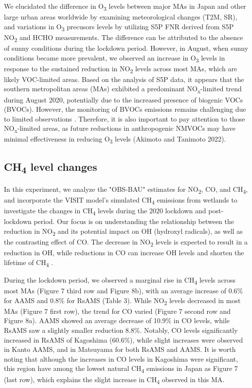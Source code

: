 We elucidated the difference in O\textsubscript{3} levels between major MAs in Japan and other large urban areas worldwide by examining meteorological changes (T2M, SR), and variations in O\textsubscript{3} precusors levels by utilizing S5P FNR derived from S5P NO\textsubscript{2} and HCHO measurements. The difference can be attributed to the absence of sunny conditions during the lockdown period. However, in August, when sunny conditions became more prevalent, we observed an increase in O\textsubscript{3} levels in response to the sustained reduction in NO\textsubscript{2} levels across most MAs, which are likely VOC-limited areas. Based on the analysis of S5P data, it appears that the southern metropolitan areas (MAs) exhibited a predominant NO\textsubscript{x}-limited trend during August 2020, potentially due to the increased presence of biogenic VOCs (BVOCs). However, the monitoring of BVOCs emissions remains challenging due to limited observations \citep{tani2021exchanges,ito2021terrestrial}. Therefore, it is also important to pay attention to those NO\textsubscript{x}-limited areas, as future reductions in anthropogenic NMVOCs may have minimal effectiveness in reducing O\textsubscript{3} levels (Akimoto and Tanimoto 2022). \par

\subsection{CH\textsubscript{4} level changes}
In this experiment, we analyze the "OBS-BAU" estimates for NO\textsubscript{2}, CO, and CH\textsubscript{4}, and incorporate the VISIT model's simulated CH\textsubscript{4} emissions from wetlands to investigate the changes in CH\textsubscript{4} levels during the 2020 lockdown and post-lockdown period. Our focus is on understanding the relationship between the reduction in NO\textsubscript{2} and its potential impact on OH (hydroxyl radicals), as well as the contrasting effect of CO. The decrease in NO\textsubscript{2} levels is expected to result in a reduction in OH, while reductions in CO can increase OH levels and shorten the lifetime of CH\textsubscript{4} \citep{akimoto2022rethinking}.\par
During the lockdown period, we observed a marginal rise in CH\textsubscript{4} levels across most MAs (Figure 7 third row and Figure 8b), with an average increase of 0.6\% for AAMS and 0.8\% for RsAMS (Table 3). While NO\textsubscript{2} levels decreased in most MAs (Figure 7 first row), the trend for CO varied (Figure 7 second row and Figure 8a). AAMS showed an average decrease of 10.9\% in CO levels, while RsAMS saw a slightly smaller reduction 8.8\%. Notably, CO levels significantly increased in RsAMS of Kagoshima (60.6\%), while slight increases were observed in Kanto AAMS, and in Matsuyama for both RsAMS and AAMS. It is worth noting that although the increases in CO levels in Kagoshima were significant, this region have among the lowest natural CH\textsubscript{4} emissions in Japan as Figure 7 (last row), which explains the slight increase in CH\textsubscript{4} observed in this MA.\par


